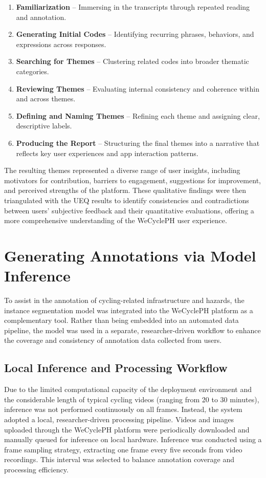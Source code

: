 \begin{enumerate}
    \item \textbf{Familiarization} – Immersing in the transcripts through repeated reading and annotation.
    \item \textbf{Generating Initial Codes} – Identifying recurring phrases, behaviors, and expressions across responses.
    \item \textbf{Searching for Themes} – Clustering related codes into broader thematic categories.
    \item \textbf{Reviewing Themes} – Evaluating internal consistency and coherence within and across themes.
    \item \textbf{Defining and Naming Themes} – Refining each theme and assigning clear, descriptive labels.
    \item \textbf{Producing the Report} – Structuring the final themes into a narrative that reflects key user experiences and app interaction patterns.
\end{enumerate}

The resulting themes represented a diverse range of user insights, including motivators for contribution, barriers to engagement, suggestions for improvement, and perceived strengths of the platform. These qualitative findings were then triangulated with the UEQ results to identify consistencies and contradictions between users' subjective feedback and their quantitative evaluations, offering a more comprehensive understanding of the WeCyclePH user experience.
 

\section{Generating Annotations via Model Inference}

To assist in the annotation of cycling-related infrastructure and hazards, the instance segmentation model was integrated into the WeCyclePH platform as a complementary tool. Rather than being embedded into an automated data pipeline, the model was used in a separate, researcher-driven workflow to enhance the coverage and consistency of annotation data collected from users.

\subsection{Local Inference and Processing Workflow}

Due to the limited computational capacity of the deployment environment and the considerable length of typical cycling videos (ranging from 20 to 30 minutes), inference was not performed continuously on all frames. Instead, the system adopted a local, researcher-driven processing pipeline. Videos and images uploaded through the WeCyclePH platform were periodically downloaded and manually queued for inference on local hardware. Inference was conducted using a frame sampling strategy, extracting one frame every five seconds from video recordings. This interval was selected to balance annotation coverage and processing efficiency.

